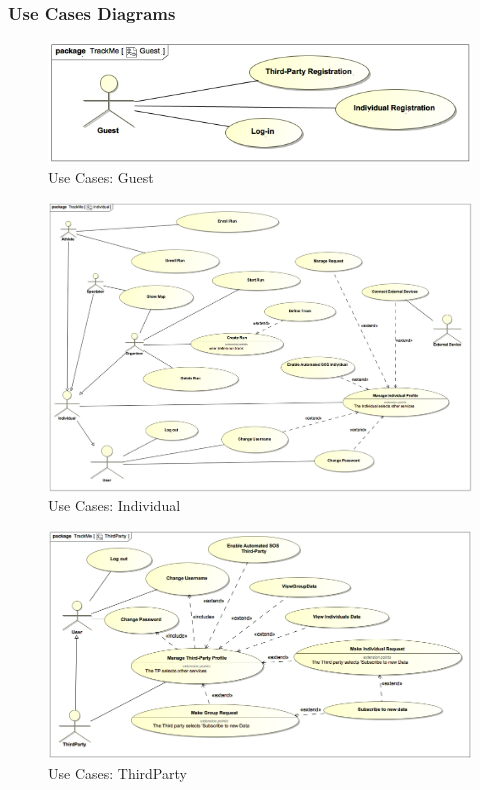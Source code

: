 \documentclass[a4paper]{article}
\begin{document}
        \subsubsection{Use Cases Diagrams}
        \begin{figure}[!htpb]
    	\centering
    	\includegraphics[width=\textwidth]{images/UML/Guest.jpg}
    	\caption{Use Cases: Guest}
    	\end{figure}
        \begin{figure}[!htpb]
    	\centering
    	\includegraphics[width=\textwidth]{images/UML/Individual.jpg}
    	\caption{Use Cases: Individual}
    	\end{figure}
    	\begin{figure}[!htpb]
    	\centering
    	\includegraphics[width=\textwidth]{images/UML/ThirdParty.jpg}
    	\caption{Use Cases: ThirdParty}
        \end{figure}
\end{document}
